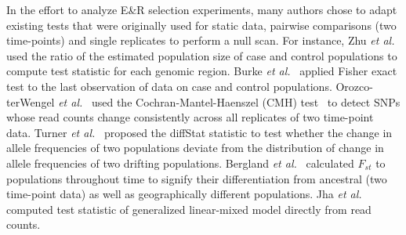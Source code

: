 In the effort to analyze E\&R selection experiments, many authors
chose to adapt existing tests that were originally used for static
data, pairwise comparisons (two time-points) and single replicates to
perform a null scan.  For instance, Zhu \emph{et
  al.}~\cite{zhou2011experimental} used the ratio of the estimated
population size of case and control populations to compute test
statistic for each genomic region. Burke \emph{et
  al.}~\cite{burke2010genome} applied Fisher exact test to the last
observation of data on case and control populations.  Orozco-terWengel
\emph{et al.}~\cite{orozco2012adaptation} used the
Cochran-Mantel-Haenszel (CMH) test~\cite{agresti2011categorical} to
detect SNPs whose read counts change consistently across all
replicates of two time-point data. Turner \emph{et
  al.}~\cite{turner2011population} proposed the diffStat statistic to
test whether the change in allele frequencies of two populations
deviate from the distribution of change in allele frequencies of two
drifting populations. Bergland \emph{et
  al.}~\cite{bergland2014genomic} calculated $F_{st}$ to populations
throughout time to signify their differentiation from ancestral (two
time-point data) as well as geographically different populations. Jha
\emph{et al.}~\cite{jha2015whole} computed test statistic of
generalized linear-mixed model directly from read counts.



